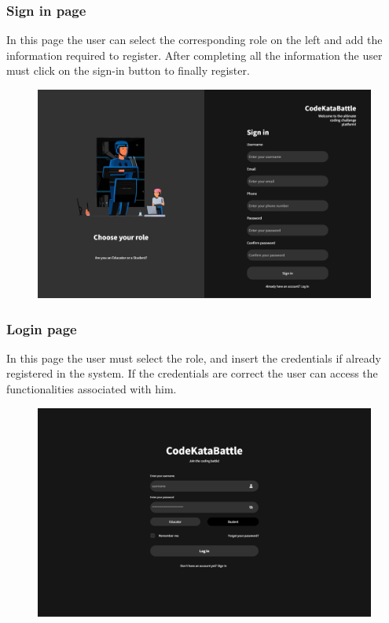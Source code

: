 \documentclass[12pt, a4paper]{report}
\begin{document}
    \subsubsection{Sign in page} 
    In this page the user can select the corresponding role on the left and add the information required to register.
    After completing all the information the user must click on the sign-in button to finally register.
    \begin{figure}[H]
        \centering
        \includegraphics[width=0.8\linewidth]{images/sign_in.png}
    \end{figure}

    \subsubsection{Login page} 
    In this page the user must select the role, and insert the credentials if already registered in the system. 
    If the credentials are correct the user can access the functionalities associated with him. 
    \begin{figure}[H]
        \centering
        \includegraphics[width=0.8\linewidth]{images/log_in.png}
    \end{figure}
\end{document}
